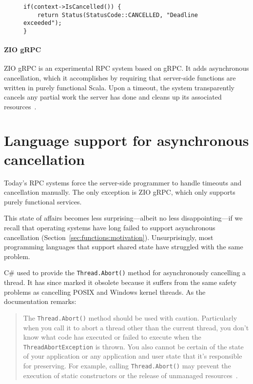 \begin{figure}
\begin{lstlisting}[label=lst:grpcflag,caption=Checking the cancellation flag in a gRPC server-side function]
if(context->IsCancelled()) {
	return Status(StatusCode::CANCELLED, "Deadline exceeded");
}
\end{lstlisting}
\end{figure}

\paragraph{ZIO gRPC}
ZIO gRPC is an experimental RPC system based on gRPC.  It adds asynchronous
cancellation, which it accomplishes by requiring that server-side functions are
written in purely functional Scala.  Upon a timeout, the system transparently cancels
any partial work the server has done and cleans up its associated
resources~\cite{www-zio-grpc}.


\section{Language support for asynchronous cancellation}
\label{sec:strobelight:cancellation}

Today's RPC systems force the server-side programmer to handle timeouts and
cancellation manually.  The only exception is ZIO gRPC, which only supports purely
functional services.

This state of affairs becomes less surprising---albeit no less disappointing---if we
recall that operating systems have long failed to support asynchronous cancellation
(Section~\ref{sec:functions:motivation}).  Unsurprisingly, most programming languages
that support shared state have struggled with the same problem.

C\# used to provide the \texttt{Thread.Abort()} method for asynchronously cancelling
a thread.  It has since marked it obsolete because it suffers from the same safety
problems as cancelling POSIX and Windows kernel threads.  As the documentation
remarks:
\begin{quote}
The \texttt{Thread.Abort()} method should be used with caution.  Particularly when
you call it to abort a thread other than the current thread, you don't know what code
has executed or failed to execute when the \texttt{ThreadAbortException} is thrown.
You also cannot be certain of the state of your application or any application and
user state that it's responsible for preserving.  For example, calling
\texttt{Thread.Abort()} may prevent the execution of static constructors or the
release of unmanaged resources~\cite{www-csharp-abort}.
\end{quote}

